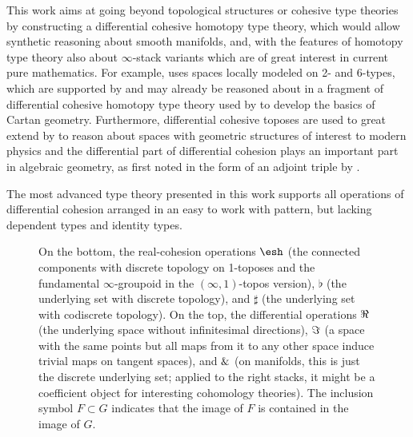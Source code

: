 \documentclass{article}
\begin{document}
This work aims at going beyond topological structures or cohesive type theories 
by constructing a differential cohesive homotopy type theory, 
which would allow synthetic reasoning about smooth manifolds,
and, with the features of homotopy type theory also about $\infty$-stack variants 
which are of great interest in current pure
mathematics. For example, \citet{SatiSchreiberStasheff2012} uses spaces locally
modeled on 2- and 6-types, which are supported by and may already be reasoned
about in a fragment of differential cohesive homotopy type theory used by
\cite{Wellen2017} to develop the basics of Cartan geometry.
Furthermore, differential cohesive toposes are used to great extend by \citet{Schreiber2013}
to reason about spaces with geometric structures of interest to modern physics
and the differential part of differential cohesion plays an important part in algebraic geometry,
as first noted in the form of an adjoint triple by \citet{SimpsonTeleman}. 

The most advanced type theory presented in this work supports all operations of
differential cohesion arranged in an easy to work with pattern, but lacking
dependent types and identity types.


\begin{wrapfigure}{R}{0.5\textwidth}
\begin{center}
\end{center}
\caption{On the bottom, the real-cohesion operations $\shape$ (the connected
  components with discrete topology on 1-toposes and the fundamental $\infty$-groupoid in the $(\infty,1)$-topos version), 
  $\flat$ (the underlying set with discrete
  topology), and $\sharp$ (the underlying set with codiscrete topology). On the
  top, the differential operations $\Re$ (the underlying space without infinitesimal directions), 
  $\Im$ (a space with the same points but all maps from it to any other space induce trivial maps on tangent spaces), and
  $\&$ (on manifolds, this is just the discrete underlying set; applied to the right stacks, it might be a coefficient object for interesting cohomology theories). The inclusion symbol $F \subset G$ indicates that the image of
  $F$ is contained in the image of $G$.}
\label{fig:modalities}
\end{wrapfigure}
\end{document}
